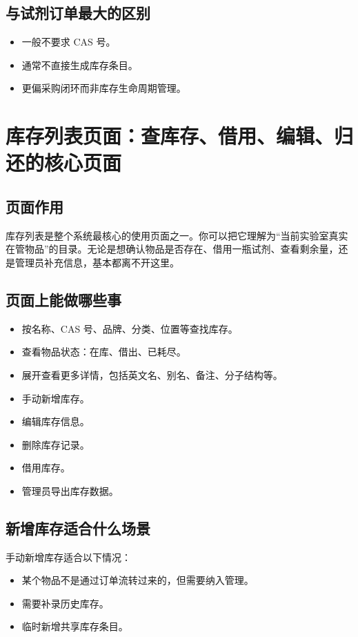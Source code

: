 \documentclass[12pt,a4paper]{ctexart}
\begin{document}
\subsection{与试剂订单最大的区别}
\begin{itemize}
  \item 一般不要求 CAS 号。
  \item 通常不直接生成库存条目。
  \item 更偏采购闭环而非库存生命周期管理。
\end{itemize}

\newpage
\section{库存列表页面：查库存、借用、编辑、归还的核心页面}

\subsection{页面作用}
库存列表是整个系统最核心的使用页面之一。你可以把它理解为“当前实验室真实在管物品”的目录。无论是想确认物品是否存在、借用一瓶试剂、查看剩余量，还是管理员补充信息，基本都离不开这里。

\subsection{页面上能做哪些事}
\begin{itemize}
  \item 按名称、CAS 号、品牌、分类、位置等查找库存。
  \item 查看物品状态：在库、借出、已耗尽。
  \item 展开查看更多详情，包括英文名、别名、备注、分子结构等。
  \item 手动新增库存。
  \item 编辑库存信息。
  \item 删除库存记录。
  \item 借用库存。
  \item 管理员导出库存数据。
\end{itemize}

\subsection{新增库存适合什么场景}
手动新增库存适合以下情况：
\begin{itemize}
  \item 某个物品不是通过订单流转过来的，但需要纳入管理。
  \item 需要补录历史库存。
  \item 临时新增共享库存条目。
\end{itemize}
\end{document}
